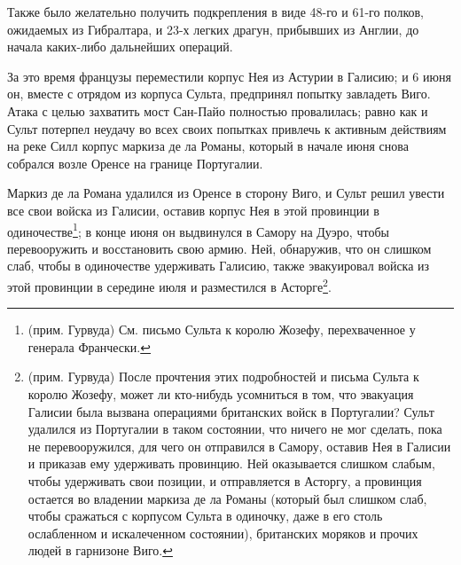 \documentclass[
  oneside,
  12pt,
  titlepage]{book}
\begin{document}
Также было желательно получить подкрепления в виде 48-го и 61-го полков, ожидаемых из Гибралтара, и 23-х легких драгун, прибывших из Англии, до начала каких-либо дальнейших операций.

За это время французы переместили корпус Нея из Астурии в Галисию; и 6 июня он, вместе с отрядом из корпуса Сульта, предпринял попытку завладеть Виго. Атака с целью захватить мост Сан-Пайо полностью провалилась; равно как и Сульт потерпел неудачу во всех своих попытках привлечь к активным действиям на реке Силл корпус маркиза де ла Романы, который в начале июня снова собрался возле Оренсе на границе Португалии.

Маркиз де ла Романа удалился из Оренсе в сторону Виго, и Сульт решил увести все свои войска из Галисии, оставив корпус Нея в этой провинции в одиночестве\footnote{(прим. Гурвуда) См. письмо Сульта к королю Жозефу, перехваченное у генерала Франчески.}; в конце июня он выдвинулся в Самору на Дуэро, чтобы перевооружить и восстановить свою армию. Ней, обнаружив, что он слишком слаб, чтобы в одиночестве удерживать Галисию, также эвакуировал войска из этой провинции в середине июля и разместился в Асторге\footnote{(прим. Гурвуда) После прочтения этих подробностей и письма Сульта к королю Жозефу, может ли кто-нибудь усомниться в том, что эвакуация Галисии была вызвана операциями британских войск в Португалии? Сульт удалился из Португалии в таком состоянии, что ничего не мог сделать, пока не перевооружился, для чего он отправился в Самору, оставив Нея в Галисии и приказав ему удерживать провинцию. Ней оказывается слишком слабым, чтобы удерживать свои позиции, и отправляется в Асторгу, а провинция остается во владении маркиза де ла Романы (который был слишком слаб, чтобы сражаться с корпусом Сульта в одиночку, даже в его столь ослабленном и искалеченном состоянии), британских моряков и прочих людей в гарнизоне Виго.}.
\end{document}
